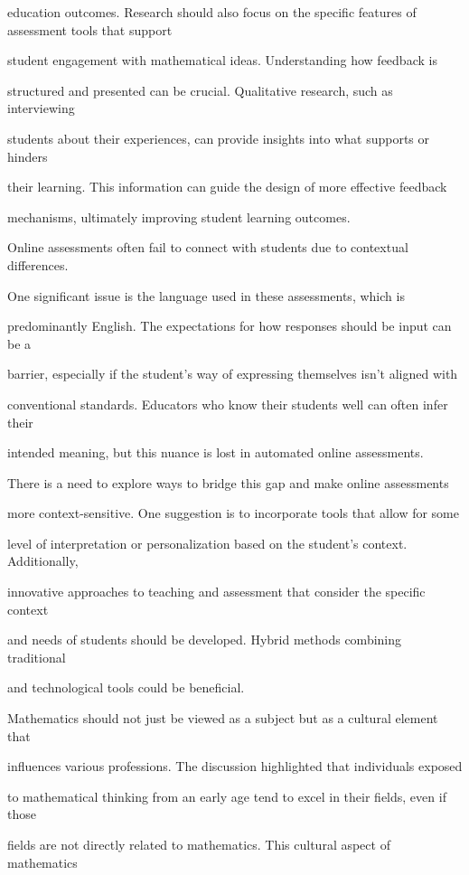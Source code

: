 \documentclass[11pt]{article}
\begin{document}
education outcomes. Research should also focus on the specific features of assessment tools that support

student engagement with mathematical ideas. Understanding how feedback is

structured and presented can be crucial. Qualitative research, such as interviewing

students about their experiences, can provide insights into what supports or hinders

their learning. This information can guide the design of more effective feedback

mechanisms, ultimately improving student learning outcomes.

Online assessments often fail to connect with students due to contextual differences.

One significant issue is the language used in these assessments, which is

predominantly English. The expectations for how responses should be input can be a

barrier, especially if the student's way of expressing themselves isn't aligned with

conventional standards. Educators who know their students well can often infer their

intended meaning, but this nuance is lost in automated online assessments.

There is a need to explore ways to bridge this gap and make online assessments

more context-sensitive. One suggestion is to incorporate tools that allow for some

level of interpretation or personalization based on the student's context. Additionally,

innovative approaches to teaching and assessment that consider the specific context

and needs of students should be developed. Hybrid methods combining traditional

and technological tools could be beneficial.

Mathematics should not just be viewed as a subject but as a cultural element that

influences various professions. The discussion highlighted that individuals exposed

to mathematical thinking from an early age tend to excel in their fields, even if those

fields are not directly related to mathematics. This cultural aspect of mathematics
\end{document}
